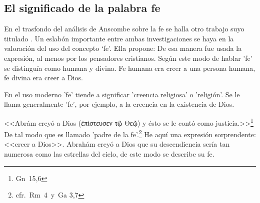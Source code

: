 \subsection{El significado de la palabra fe}

En el trasfondo del análisis de Anscombe sobre la fe se halla otro trabajo suyo
titulado . Un eslabón importante entre
ambas investigaciones se haya en la valoración del uso del concepto `fe'. Ella
propone:  De esa manera
fue usada la expresión, al menos por los pensadores cristianos. Según este modo
de hablar 'fe' se distinguía como humana y divina. Fe humana era creer a una
persona humana, fe divina era creer a Dios.

En el uso moderno 'fe' tiende a significar 'creencia religiosa' o 'religión'. Se
le llama generalmente 'fe', por ejemplo, a la creencia en la existencia de Dios.

<<Abrám creyó a Dios (\textgreek{ἐπίστευσεν τῷ Θεῷ}) y ésto se le contó como
justicia.>>\footnote{Gn~15,6} De tal modo que es llamado 'padre de la
fe'.\footnote{cfr.~Rm~4~y~Ga 3,7} He aquí una expresión sorprendente: <<creer a
Dios>>. Abrahám creyó a Dios que su descendiencia sería tan numerosa como las
estrellas del cielo, de este modo se describe su fe.
